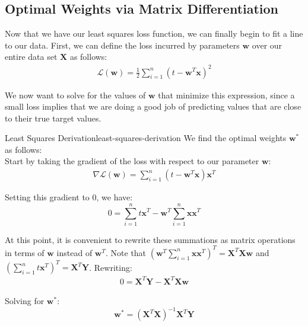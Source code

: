 \subsection{Optimal Weights via Matrix Differentiation}
Now that we have our least squares loss function, we can finally begin to fit a line to our data. First, we can define the loss incurred by parameters $\textbf{w}$ over our entire data set $\textbf{X}$ as follows:
\begin{align}
    \mathcal{L}(\textbf{w}) = \frac{1}{2} \sum_{i=1}^{n} (t - \textbf{w}^{T}\textbf{x})^2
\end{align}


We now want to solve for the values of $\textbf{w}$ that minimize this expression, since a small loss implies that we are doing a good job of predicting values that are close to their true target values.

\begin{derivation}{Least Squares Derivation}{least-squares-derivation}
    We find the optimal weights $\textbf{w}^{*}$ as follows: \\

    Start by taking the gradient of the loss with respect to our parameter $\textbf{w}$:
    \begin{align*}
        \nabla \mathcal{L}(\textbf{w}) = \sum_{i=1}^{n} (t - \textbf{w}^{T}\textbf{x})\textbf{x}^{T}
    \end{align*}

    Setting this gradient to 0, we have:
    \begin{equation} \label{least-squares-solving-for-w}
        0 = \sum_{i=1}^{n} t \textbf{x}^{T} - \textbf{w}^{T} \sum_{i=1}^{n} \textbf{x}\textbf{x}^{T}
    \end{equation}

    At this point, it is convenient to rewrite these summations as matrix operations in terms of $\textbf{w}$ instead of $\textbf{w}^{T}$. Note that $(\textbf{w}^{T} \sum_{i=1}^{n} \textbf{x}\textbf{x}^{T})^{T} = \textbf{X}^{T}\textbf{X}\textbf{w}$ and $(\sum_{i=1}^{n} t \textbf{x}^{T})^{T} = \textbf{X}^{T}\textbf{Y}$. Rewriting:
    \begin{align*}
        0 = \textbf{X}^{T}\textbf{Y} - \textbf{X}^{T}\textbf{X}\textbf{w}
    \end{align*}

    Solving for $\textbf{w}^{*}$:
    \begin{equation} \label{least-squares-solved-for-w}
        \textbf{w}^{*} = (\textbf{X}^{T}\textbf{X})^{-1}\textbf{X}^{T}\textbf{Y}
    \end{equation}
\end{derivation}

